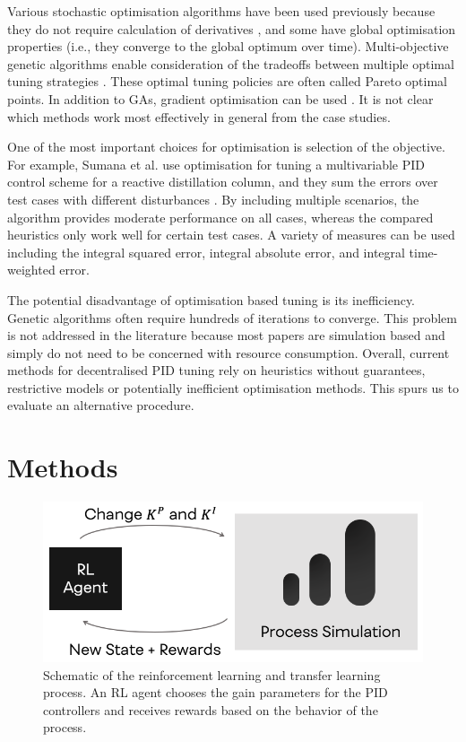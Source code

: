 Various stochastic optimisation algorithms have been used previously because they do not require calculation of derivatives \cite{Sumana2010, Ganesh2010, Behroozsarand2012}, and some have global optimisation properties (i.e., they converge to the global optimum over time). Multi-objective genetic algorithms enable consideration of the tradeoffs between multiple optimal tuning strategies \cite{Behroozsarand2012, Pajares2019}. These optimal tuning policies are often called Pareto optimal points. In addition to GAs, gradient optimisation can be used \cite{Sommer2011}. It is not clear which methods work most effectively in general from the case studies.

One of the most important choices for optimisation is selection of the objective. For example, Sumana et al. use optimisation for tuning a multivariable PID control scheme for a reactive distillation column, and they sum the errors over  test cases with different disturbances \cite{Sumana2010}. By including multiple scenarios, the algorithm provides moderate performance on all cases, whereas the compared heuristics only work well for certain test cases. A variety of measures can be used including the integral squared error, integral absolute error, and integral time-weighted error. 

The potential disadvantage of optimisation based tuning is its inefficiency. Genetic algorithms often require hundreds of iterations to converge. This problem is not addressed in the literature because most papers are simulation based and simply do not need to be concerned with resource consumption. Overall, current methods for decentralised PID tuning rely on heuristics without guarantees, restrictive models or potentially inefficient optimisation methods.  This spurs us to evaluate an alternative procedure.

\section{Methods}
\begin{figure}
  \includegraphics[width=\linewidth]{gfx/Chapter05/rl_tuning_loop.png}
  \caption{Schematic of the reinforcement learning and transfer learning process. An RL agent chooses the gain parameters for the PID controllers and receives rewards based on the behavior of the process.}
  \label{immalabel}
\end{figure}

